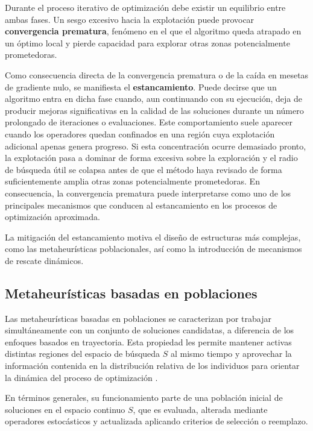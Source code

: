 Durante el proceso iterativo de optimización debe existir un equilibrio entre
ambas fases. Un sesgo excesivo hacia la explotación puede provocar
\textbf{convergencia prematura}, fenómeno en el que el algoritmo queda atrapado
en un óptimo local y pierde capacidad para explorar otras zonas potencialmente
prometedoras.

Como consecuencia directa de la convergencia prematura o de la caída en mesetas de gradiente nulo, se manifiesta el \textbf{estancamiento}. Puede decirse que un algoritmo entra en dicha fase cuando, aun continuando con su ejecución, deja de producir mejoras significativas en la calidad de las soluciones durante un número prolongado de iteraciones o evaluaciones. Este comportamiento suele aparecer cuando los operadores quedan confinados en una región cuya explotación adicional apenas genera progreso. Si esta concentración ocurre demasiado pronto, la explotación pasa a dominar de forma excesiva sobre la exploración y el radio de búsqueda útil se colapsa antes de que el método haya revisado de forma suficientemente amplia otras zonas potencialmente prometedoras. En consecuencia, la convergencia prematura puede interpretarse como uno de los principales mecanismos que conducen al estancamiento en los procesos de optimización aproximada.

La mitigación del estancamiento motiva el diseño de estructuras más complejas, como las metaheurísticas poblacionales, así como la introducción de mecanismos de rescate dinámicos.

\subsection{Metaheurísticas basadas en poblaciones}
\label{subsec:mh_poblacion}

Las metaheurísticas basadas en poblaciones se caracterizan por trabajar simultáneamente con un conjunto de soluciones candidatas, a diferencia de los enfoques basados en trayectoria. Esta propiedad les permite mantener activas distintas regiones del espacio de búsqueda $S$ al mismo tiempo y aprovechar la información contenida en la distribución relativa de los individuos para orientar la dinámica del proceso de optimización \cite{talbi2009metaheuristics}.

En términos generales, su funcionamiento parte de una población inicial de
soluciones en el espacio continuo \(S\), que es evaluada, alterada mediante
operadores estocásticos y actualizada aplicando criterios de selección o
reemplazo.

